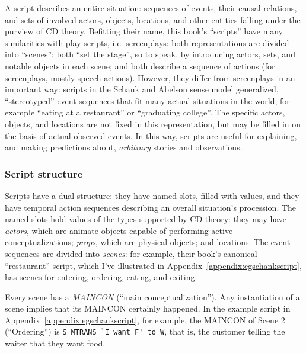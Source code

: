 A script describes an entire situation: sequences of events, their causal relations, and sets of involved actors, objects, locations, and other entities falling under the purview of CD theory. Befitting their name, this book's ``scripts'' have many similarities with play scripts, i.e. screenplays: both representations are divided into ``scenes''; both ``set the stage'', so to speak, by introducing actors, sets, and notable objects in each scene; and both describe a sequence of actions (for screenplays, mostly speech actions). However, they differ from screenplays in an important way: scripts in the Schank and Abelson sense model generalized, ``stereotyped'' event sequences that fit many actual situations in the world, for example ``eating at a restaurant'' or ``graduating college''. The specific actors, objects, and locations are not fixed in this representation, but may be filled in on the basis of actual observed events. In this way, scripts are useful for explaining, and making predictions about, \textit{arbitrary} stories and observations.

\subsubsection{Script structure}
Scripts have a dual structure: they have named slots, filled with values, %
and they have temporal action sequences describing an overall situation's procession. The named slots hold values of the types supported by CD theory: they may have \textit{actors}, which are animate objects capable of performing active conceptualizations; \textit{props}, which are physical objects; and locations. The event sequences are divided into \textit{scenes}: for example, their book's canonical ``restaurant'' script, which I've illustrated in Appendix~\ref{appendix:egschankscript}, has scenes for entering, ordering, eating, and exiting.

Every scene has a \textit{MAINCON} (``main conceptualization''). Any instantiation of a scene implies that its MAINCON certainly happened. In the example script in Appendix~\ref{appendix:egschankscript}, for example, the MAINCON of Scene 2 (``Ordering'') is \lstinline{S MTRANS `I want F' to W}, that is, the customer telling the waiter that they want food.

